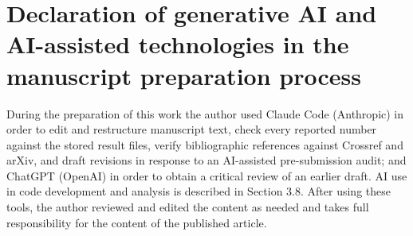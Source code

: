 \documentclass[preprint,12pt]{elsarticle}
\begin{document}
\section*{Declaration of generative AI and AI-assisted technologies in the manuscript preparation process}
During the preparation of this work the author used Claude Code (Anthropic) in order to edit
and restructure manuscript text, check every reported number against the stored result files,
verify bibliographic references against Crossref and arXiv, and draft revisions in response to
an AI-assisted pre-submission audit; and ChatGPT (OpenAI) in order to obtain a critical review
of an earlier draft. AI use in code development and analysis is described in Section 3.8. After using these tools, the
author reviewed and edited the content as needed and takes full responsibility for the content
of the published article.
\end{document}
